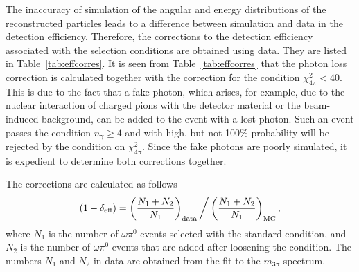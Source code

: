 \documentclass[twocolumn,aps,prd,floatfix,nofootinbib,superscriptaddress]{revtex4-2}
\begin{document}
The inaccuracy of simulation of the angular and energy distributions of the reconstructed particles leads to a difference between simulation and data in the detection efficiency.
Therefore, the corrections to the detection efficiency associated with the selection conditions are obtained using data.
They are listed in Table~\ref{tab:effcorres}.
It is seen from Table~\ref{tab:effcorres} that the photon loss correction is calculated together with the correction for the condition $\chi^2_{4\pi}<40$.
This is due to the fact that a fake photon, which arises, for example, due to the nuclear interaction of charged pions with the detector material or the beam-induced background, can be added to the event with a lost photon.
Such an event passes the condition $n_\gamma\geq 4$ and with high, but not 100\% probability will be rejected by the condition on $\chi^2_{4\pi}$.
Since the fake photons are poorly simulated, it is expedient to determine both corrections together.

The corrections are calculated as follows
\begin{equation}
\label{eq:cor}
	( 1 - \delta_{\text{eff}}) =
	\left(\frac{N_1+N_2}{N_1}\right)_{\rm data}\bigg/
	\left(\frac{N_1+N_2}{N_1}\right)_{\rm MC},
\end{equation}
where $N_1$ is the number of $\omega\pi^0$ events selected with the standard condition,
and $N_2$ is the number of $\omega\pi^0$ events that are added after loosening the condition.
The numbers $N_1$ and $N_2$ in data are obtained from the fit to the $m_{3\pi}$ spectrum.
\end{document}
